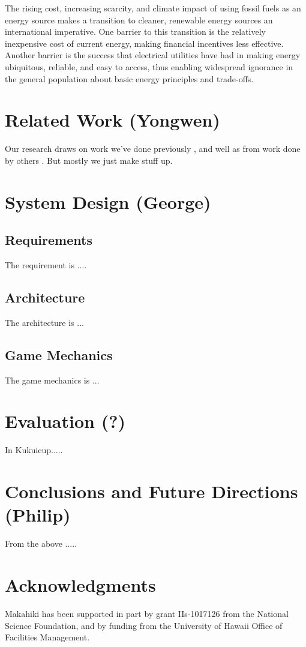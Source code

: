 \documentclass{acm_proc_article-sp}
\begin{document}
The rising cost, increasing scarcity, and climate impact of using fossil
fuels as an energy source makes a transition to cleaner, renewable energy
sources an international imperative.  One barrier to this transition is the
relatively inexpensive cost of current energy, making financial incentives
less effective.   Another barrier is the success that electrical utilities
have had in making energy ubiquitous, reliable, and easy to access, thus
enabling widespread ignorance in the general population about basic energy
principles and trade-offs.  


\section{Related Work (Yongwen)}
Our research draws on work we've done previously
\cite{csdl2-10-05,csdl2-10-07,csdl2-11-02,csdl2-11-03}, and well as from
work done by others \cite{Lazzaro2010}.  But mostly we just make stuff up.

\section{System Design (George)}

\subsection{Requirements}
The requirement is ....

\subsection{Architecture}
The architecture is ...

\subsection{Game Mechanics}
The game mechanics is ...

\section{Evaluation (?)}
In Kukuicup.....

\section{Conclusions and Future Directions (Philip)}
From the above .....

\section{Acknowledgments}
Makahiki has been supported in part by grant IIs-1017126 from the National
Science Foundation, and by funding from the University of Hawaii Office of Facilities
Management. 
%

  
%
%
\balancecolumns
\end{document}
